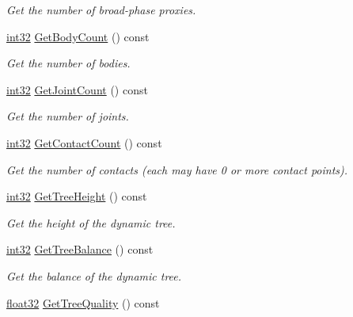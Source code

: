 \begin{DoxyCompactItemize}
\begin{DoxyCompactList}\small\item\em Get the number of broad-\/phase proxies. \end{DoxyCompactList}\item 
\mbox{\hyperlink{b2_settings_8h_a43d43196463bde49cb067f5c20ab8481}{int32}} \mbox{\hyperlink{classb2_world_a41c8b37baf5165c06932e8f08eb758de}{Get\+Body\+Count}} () const
\begin{DoxyCompactList}\small\item\em Get the number of bodies. \end{DoxyCompactList}\item 
\mbox{\hyperlink{b2_settings_8h_a43d43196463bde49cb067f5c20ab8481}{int32}} \mbox{\hyperlink{classb2_world_a98bd6ca53dbc376f210beced33901934}{Get\+Joint\+Count}} () const
\begin{DoxyCompactList}\small\item\em Get the number of joints. \end{DoxyCompactList}\item 
\mbox{\hyperlink{b2_settings_8h_a43d43196463bde49cb067f5c20ab8481}{int32}} \mbox{\hyperlink{classb2_world_aa47375fc3ca9f09d0350c61cfeabcee9}{Get\+Contact\+Count}} () const
\begin{DoxyCompactList}\small\item\em Get the number of contacts (each may have 0 or more contact points). \end{DoxyCompactList}\item 
\mbox{\hyperlink{b2_settings_8h_a43d43196463bde49cb067f5c20ab8481}{int32}} \mbox{\hyperlink{classb2_world_abc99b2beb6ba79ac6c80f33bac264b52}{Get\+Tree\+Height}} () const
\begin{DoxyCompactList}\small\item\em Get the height of the dynamic tree. \end{DoxyCompactList}\item 
\mbox{\hyperlink{b2_settings_8h_a43d43196463bde49cb067f5c20ab8481}{int32}} \mbox{\hyperlink{classb2_world_aaca027331f06d93d978b44e065873f80}{Get\+Tree\+Balance}} () const
\begin{DoxyCompactList}\small\item\em Get the balance of the dynamic tree. \end{DoxyCompactList}\item 
\mbox{\hyperlink{b2_settings_8h_aacdc525d6f7bddb3ae95d5c311bd06a1}{float32}} \mbox{\hyperlink{classb2_world_a562935b3b8161dd18a467e02f479e88a}{Get\+Tree\+Quality}} () const

\end{DoxyCompactItemize}

